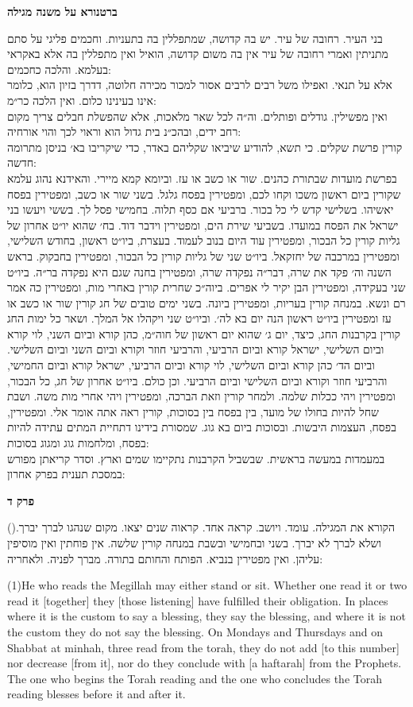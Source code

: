 \documentclass[12pt, openany]{book}
\newcommand{\sethebfont}{
\fontsize{10.5pt}{13.1pt} \selectfont
}
\newcommand{\hebeng}[2]{
	{\sethebfont #1\\}
	
	\begin{english}
		#2
	\end{english}
	\clearpage
}
\newcommand{\chapname}{}
\newcommand{\sectname}{}
\newcommand{\newchap}[1]{
	\addcontentsline{toc}{chapter}{#1}
	\renewcommand{\chapname}{#1}
		\begin{center}
			\textbf{%
\fontsize{16pt}{16pt}\selectfont
				#1}
		\end{center}
}
\newcommand{\newsection}[1]{
	\renewcommand{\sectname}{#1}	
	\vspace{-\baselineskip}
	\begin{center}
		\textbf{%
\fontsize{16pt}{16pt}\selectfont
			#1}
	\end{center}
	\vspace{-\baselineskip}
	\nopagebreak
}
\newcommand{\blockcomment}[2]{ 
\newsection{#1}
\sethebfont	#2}
\newcommand{\vsnum}[1]{(\hebrewnumeral{#1})\space}
\newcommand{\vsnumeng}[1]{(#1)\space}
\begin{document}
\clearpage
\blockcomment{ברטנורא על משנה מגילה}{בני העיר. רחובה של עיר. יש בה קדושה, שמתפללין בה בתעניות. וחכמים פליגי על סתם מתניתין ואמרי רחובה של עיר אין בה משום קדושה, הואיל ואין מתפללין בה אלא באקראי בעלמא. והלכה כחכמים:\\אלא על תנאי. ואפילו משל רבים לרבים אסור למכור מכירה חלוטה, דדרך בזיון הוא, כלומר אינו בעינינו כלום. ואין הלכה כר״מ:\\ואין מפשילין. גודלים ופותלים. וה״ה לכל שאר מלאכות, אלא שהפשלת חבלים צריך מקום רחב ידים, ובהכ״נ בית גדול הוא וראוי לכך והוי אורחיה:\\קורין פרשת שקלים. כי תשא, להודיע שיביאו שקליהם באדר, כדי שיקריבו בא׳ בניסן מתרומה חדשה:\\בפרשת מועדות שבתורת כהנים. שור או כשב או עז. וביומא קמא מיירי. והאידנא נהוג עלמא שקורין ביום ראשון משכו וקחו לכם, ומפטירין בפסח גלגל. בשני שור או כשב, ומפטירין בפסח יאשיהו. בשלישי קדש לי כל בכור. ברביעי אם כסף תלוה. בחמישי פסל לך. בששי ויעשו בני ישראל את הפסח במועדו. בשביעי שירת הים, ומפטירין וידבר דוד. בח׳ שהוא יו״ט אחרון של גליות קורין כל הבכור, ומפטירין עוד היום בנוב לעמוד. בעצרת, ביו״ט ראשון, בחודש השלישי, ומפטירין במרכבה של יחזקאל. ביו״ט שני של גליות קורין כל הבכור, ומפטירין בחבקוק. בראש השנה וה׳ פקד את שרה, דבר״ה נפקדה שרה, ומפטירין בחנה שגם היא נפקדה בר״ה. ביו״ט שני בעקידה, ומפטירין הבן יקיר לי אפרים. ביוה״כ שחרית קורין באחרי מות, ומפטירין כה אמר רם ונשא. במנחה קורין בעריות, ומפטירין ביונה. בשני ימים טובים של חג קורין שור או כשב או עז ומפטירין ביו״ט ראשון הנה יום בא לה׳. וביו״ט שני ויקהלו אל המלך. ושאר כל ימות החג קורין בקרבנות החג, כיצד, יום ג׳ שהוא יום ראשון של חוה״מ, כהן קורא וביום השני, לוי קורא וביום השלישי, ישראל קורא וביום הרביעי, והרביעי חוזר וקורא וביום השני וביום השלישי. וביום הד׳ כהן קורא וביום השלישי, לוי קורא וביום הרביעי, ישראל קורא וביום החמישי, והרביעי חוזר וקורא וביום השלישי וביום הרביעי. וכן כולם. ביו״ט אחרון של חג, כל הבכור, ומפטירין ויהי ככלות שלמה. ולמחר קורין וזאת הברכה, ומפטירין ויהי אחרי מות משה. ושבת שחל להיות בחולו של מועד, בין בפסח בין בסוכות, קורין ראה אתה אומר אלי. ומפטירין, בפסח, העצמות היבשות. ובסוכות ביום בא גוג. שמסורת בידינו דתחיית המתים עתידה להיות בפסח, ומלחמות גוג ומגוג בסוכות: \\במעמדות במעשה בראשית. שבשביל הקרבנות נתקיימו שמים וארץ. וסדר קריאתן מפורש במסכת תענית בפרק אחרון:\\\n}\clearpage %
\newchap{פרק ד}
\hebeng{\vsnum{1}הקורא את המגילה. עומד. ויושב. קראה אחד. קראוה שנים יצאו. מקום שנהגו לברך יברך. ושלא לברך לא יברך. בשני ובחמישי ובשבת במנחה קורין שלשה. אין פוחתין ואין מוסיפין עליהן. ואין מפטירין בנביא. הפותח והחותם בתורה. מברך לפניה. ולאחריה: }{\vsnumeng{1}He who reads the Megillah may either stand or sit. Whether one read it or two read it {[together]} they {[those listening]} have fulfilled their obligation. In places where it is the custom to say a blessing, they say the blessing, and where it is not the custom they do not say the blessing. On Mondays and Thursdays and on Shabbat at minhah, three read from the torah, they do not add {[to this number]} nor decrease {[from it]}, nor do they conclude with {[a haftarah]} from the Prophets. The one who begins the Torah reading and the one who concludes the Torah reading blesses before it and after it.}%
\end{document}
